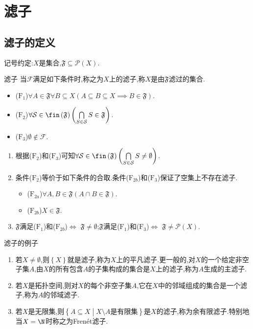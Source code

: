 \chapter{滤子}

\section{滤子的定义}

记号约定:$X$是集合,$\mathfrak{F}\subseteq\mathcal{P}\left(X\right)$.

\begin{definition}{滤子}{}
	当$\mathcal{F}$满足如下条件时,称之为$X$上的滤子,称$X$是由$\mathfrak{F}$滤过的集合.
	\begin{itemize}
		\item ($\mathrm{F}_{1}$)$\forall A\in\mathfrak{F}\forall B\subseteq X\left(A\subseteq B\subseteq X\implies B\in\mathfrak{F}\right)$.
		\item ($\mathrm{F}_{2}$)$\forall\mathcal{S}\in\fin\left(\mathfrak{F}\right)\left(\bigcap\limits_{S\in\mathcal{S}}S\in\mathfrak{F}\right)$.
		\item ($\mathrm{F}_{3}$)$\emptyset\notin\mathcal{F}$.
	\end{itemize}
\end{definition}

\begin{remark}{}{}
	\begin{enumerate}
		\item 根据($\mathrm{F}_{2}$)和($\mathrm{F}_{3}$)可知$\forall\mathcal{S}\in\fin\left(\mathfrak{F}\right)\left(\bigcap\limits_{S\in\mathcal{S}}S\neq\emptyset\right)$.
		\item 条件($\mathrm{F}_{2}$)等价于如下条件的合取.条件($\mathrm{F}_{2b}$)和($\mathrm{F}_{3}$)保证了空集上不存在滤子.
		\begin{itemize}
			\item ($\mathrm{F}_{2a}$)$\forall A,B\in\mathfrak{F}\left(A\cap B\in\mathfrak{F}\right)$.
			\item ($\mathrm{F}_{2b}$)$X\in\mathfrak{F}$.
		\end{itemize}
		\item $\mathfrak{F}$满足($\mathrm{F}_{1}$)和($\mathrm{F}_{2b}$)$\iff$ $\mathfrak{F}\neq\emptyset$;$\mathfrak{F}$满足($\mathrm{F}_{1}$)和($\mathrm{F}_{3}$)$\iff$ $\mathfrak{F}\neq\mathcal{P}\left(X\right)$.
	\end{enumerate}
\end{remark}

\begin{example}{滤子的例子}{}
	\begin{enumerate}
		\item 若$X\neq\emptyset$,则$\left\{X\right\}$就是滤子,称为$X$上的平凡滤子.更一般的,对$X$的一个给定非空子集$A$,由$X$的所有包含$A$的子集构成的集合是$X$上的滤子,称为$A$生成的主滤子.
		\item 若$X$是拓扑空间,则对$X$的每个非空子集$A$,它在$X$中的邻域组成的集合是一个滤子,称为$A$的邻域滤子.
		\item 若$X$是无限集,则$\left\{A\subseteq X\middle|X\setminus A\text{是有限集}\right\}$是$X$的滤子,称为余有限滤子.特别地当$X=\N$时称之为Fren\'{e}t滤子.
	\end{enumerate}
\end{example}